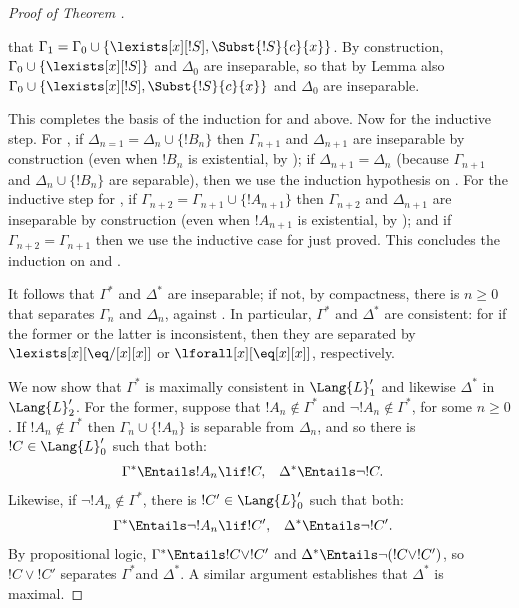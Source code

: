 \documentclass[../../include/open-logic-section]{subfiles}
\begin{document}
\begin{proof}[Proof of Theorem ]
\begin{enumerate}
  that $\Gamma_1 = \Gamma_0 \cup \{ \lexists[x][!S], \Subst{!S}{c}{x}
  \}$. By construction, $\Gamma_0 \cup \{ \lexists[x][!S]\}$ and
  $\Delta_0$ are inseparable, so that by Lemma  also
  $\Gamma_0 \cup \{ \lexists[x][!S], \Subst{!S}{c}{x} \}$ and
  $\Delta_0$ are inseparable.
\end{enumerate}
This completes the basis of the induction for  and
 above. Now for the inductive step. For , if
$\Delta_{n=1} = \Delta_n \cup \{ !B_n \}$ then $\Gamma_{n+1}$ and
$\Delta_{n+1}$ are inseparable by construction (even when $!B_n$ is
existential, by ); if $\Delta_{n+1} = \Delta_n$
(because $\Gamma_{n+1}$ and $\Delta_n \cup \{!B_n\}$ are separable),
then we use the induction hypothesis on . For the
inductive step for , if $\Gamma_{n+2} = \Gamma_{n+1} \cup
\{!A_{n+1} \}$ then $\Gamma_{n+2}$ and $\Delta_{n+1}$ are
inseparable by construction (even when $!A_{n+1}$ is existential,
by ); and if  $\Gamma_{n+2} = \Gamma_{n+1}$ then
we use the inductive case for  just proved. This
concludes the induction on  and . 

It follows that $\Gamma^*$ and $\Delta^*$ are inseparable; if not, by
compactness, there is $n \ge 0$ that separates $\Gamma_n$ and
$\Delta_n$, against . In particular, $\Gamma^*$ and
$\Delta^*$ are consistent: for if the former or the latter is
inconsistent, then they are separated by $\lexists[x][\eq/[x][x]]$ or
  $\lforall[x][\eq[x][x]]$, respectively.

We now show that $\Gamma^*$ is maximally consistent in
$\Lang{L}'_1$ and likewise $\Delta^*$ in $\Lang{L}'_2$. For the
former, suppose that $!A_n \notin \Gamma^*$ and $\lnot !A_n
\notin \Gamma^*$, for some $n \ge 0$. If $!A_n \notin \Gamma^*$
then $\Gamma_n \cup \{!A_n \}$ is separable from $\Delta_n$, and
so there is $!C \in \Lang{L}'_0$ such that both:
\begin{align*}
  \Gamma^* & \Entails !A_n \lif !C, & 
  \Delta^* & \Entails \lnot !C.
\end{align*}
Likewise, if $\lnot !A_n \notin \Gamma^*$, there is $!C' \in
\Lang{L}'_0$ such that both:
\begin{align*}
  \Gamma^* & \Entails \lnot !A_n \lif !C', & 
  \Delta^* & \Entails \lnot !C'.
\end{align*}
By propositional logic, $\Gamma^* \Entails !C \lor !C'$ and
$\Delta^* \Entails \lnot (!C \lor !C')$, so $!C \lor
!C'$ separates $\Gamma^*$and $\Delta^*$. A similar argument
establishes that $\Delta^*$ is maximal. 


\end{proof}
\end{document}
